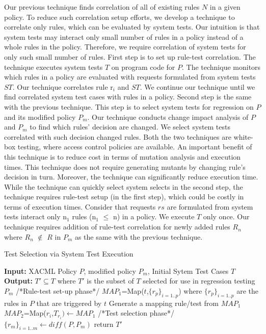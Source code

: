 Our previous technique finds correlation of all of existing rules $N$ in a given policy. To reduce
such correlation setup efforts, we develop a technique to correlate only rules, which can be evaluated
by system tests. Our intuition is that system tests may interact only small number of rules in a policy
instead of a whole rules in the policy. Therefore, we require correlation of system tests for only such small number of rules.
First step is to set up rule-test correlation.
The technique executes system tests $T$ on program code for $P$. The technique monitors which rules in a policy are evaluated with
requests formulated from system tests $ST$. Our technique correlates rule r$_i$ and $ST$.
We continue our technique until we find correlated system test cases with rules in a policy.
Second step is the same with the previous technique. This step is to select system tests for regression on $P$ and its modified policy $P_m$.
Our technique conducts change impact analysis of $P$ and $P_m$ to find which rules' decision are changed.
We select system tests correlated with such decision changed rules.
Both the two techniques are white-box testing, where access control policies are available.
An important benefit of this technique is to reduce cost in terms of mutation analysis and execution times. This technique does not require generating mutants by changing rule's decision in turn. Moreover, the technique can significantly reduce execution time.
While the technique can quickly select system selects in the second step, the technique requires rule-test setup (in the first step), which could be costly in terms of execution times. Consider that requests $rs$ are formulated from system tests interact only n$_1$ rules (n$_1$ $\leq$ n) in a policy.
We execute $T$ only once. Our technique requires addition of rule-test
correlation for newly added rules $R_n$ where $R_n$ $\notin$ $R$ in $P_m$ as the same with the previous technique.

\begin{algorithmic}
\begin{algorithm}[t]
\caption{Test Selection via System Test Execution}
\STATE \textbf{Input:} XACML Policy $P$, modified policy $P_{m}$, Initial Sytem Test Cases $T$
\STATE \textbf{Output:} $T' \subseteq T$ where $T'$ is the subset of $T$ selected for use in regression testing $P_{m}$
\STATE /*Rule-test set-up phase*/
\STATE $MAP_{1}$=Map($t$,$\{r_{p}\}_{i=1..p}$) where $\{r_{p}\}_{i=1..p}$ are the rules in $P$ that are triggered by $t$
\ENDFOR
\STATE Generate a mapping rule/test from $MAP_{1}$
\STATE $MAP_{2}$=Map($r_{i}$,$T_{r_{i}}) \leftarrow MAP_{1}$
\STATE /*Test selection phase*/
\STATE $\{r_{m}\}_{i=1..m} \leftarrow diff(P,P_{m})$
\ENDFOR
\STATE return $T'$
\end{algorithm}
\end{algorithmic}


